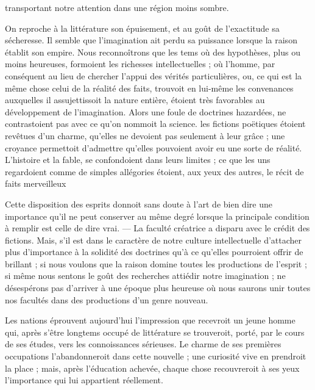 \documentclass[11pt,a4paper]{article}
\begin{document}

transportant notre attention dans une région moins sombre.

On reproche à la littérature son épuisement, et au goût de l'exactitude sa
sécheresse. Il semble que l'imagination ait perdu sa puissance lorsque la
raison établit son empire. Nous reconnoîtrons que  les
tems où des hypothèses, plus ou moins heureuses, formoient les richesses
intellectuelles ; où l'homme, par conséquent au lieu de chercher l'appui des
vérités particulières, ou, ce qui est la même chose celui de la réalité des
faits, trouvoit en lui-même les convenances auxquelles il assujettissoit la
nature entière, étoient  très favorables au développement de
l'imagination. Alors une foule de doctrines hazardées, ne contrastoient pas avec
ce qu'on nommoit la science. les fictions poëtiques étoient revêtues d'un charme,
qu'elles ne devoient pas seulement à leur grâce ; une  croyance
\struck{\ill{}}  permettoit d'admettre qu'elles pouvoient avoir
eu une sorte de réalité. L'histoire et la fable, se confondoient dans leurs
limites ; ce que les uns regardoient comme de simples allégories étoient, aux
yeux des autres, le récit de faits merveilleux


Cette disposition des esprits donnoit sans doute à l'art de bien dire une
importance qu'il ne peut conserver au même degré lorsque la principale condition
à remplir est celle de dire vrai. — La faculté créatrice a disparu avec le
crédit des fictions. Mais, s'il est dans le 
caractère de notre culture intellectuelle d'attacher plus d'importance à la
solidité des doctrines qu'à ce qu'elles pourroient offrir de brillant ; si nous
voulons que la raison domine toutes les productions de l'esprit ; si même nous
sentons le goût des recherches attiédir notre imagination ; ne désespérons pas
d'arriver à une époque plus heureuse où nous saurons unir toutes nos facultés
dans des productions d'un genre nouveau.

Les nations éprouvent aujourd'hui l'impression que recevroit un jeune homme qui,
après  s'être longtems occupé de  littérature
se trouveroit, porté, par le cours de ses études, vers les connoissances
sérieuses. Le charme de ses premières occupations l'abandonneroit dans cette
 nouvelle ; une curiosité vive en  prendroit la
place ; mais, après l'éducation achevée, chaque chose 
recouvreroit à ses yeux l'importance qui lui appartient réellement.
\end{document}
